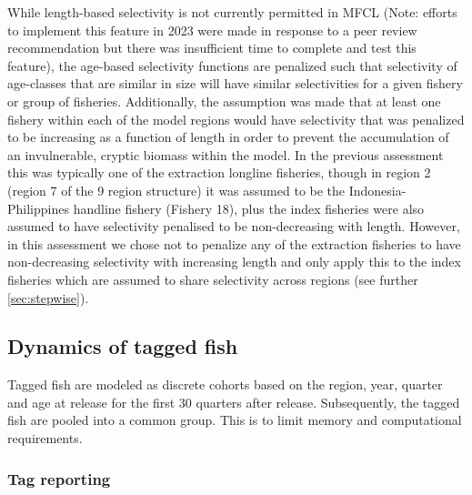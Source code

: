While length-based selectivity is not currently permitted in MFCL (Note: efforts to implement this feature in 2023 were made in response to a peer review recommendation but there was insufficient time to complete and test this feature), the age-based selectivity functions are penalized such that selectivity of age-classes that are similar in size will have similar selectivities for a given fishery or group of fisheries. Additionally, the assumption was made that at least one fishery within each of the model regions would have selectivity that was penalized to be increasing as a function of length in order to prevent the accumulation of an invulnerable, cryptic biomass within the model. In the previous assessment this was typically one of the extraction longline fisheries, though in region 2 (region 7 of the 9 region structure) it was assumed to be the Indonesia-Philippines handline fishery (Fishery 18), plus the index fisheries were also assumed to have selectivity penalised to be non-decreasing with length. However, in this assessment we chose not to penalize any of the extraction fisheries to have non-decreasing selectivity with increasing length and only apply this to the index fisheries which are assumed to share selectivity across regions (see further \autoref{sec:stepwise}).

\subsection{Dynamics of tagged fish}
\label{sec:model_tag_dynamics}

Tagged fish are modeled as discrete cohorts based on the region, year, quarter and age at release for the first 30 quarters after release. Subsequently, the tagged fish are pooled into a common group. This is to limit memory and computational requirements.

\subsubsection{Tag reporting}
\label{sec:reporting_rate}

